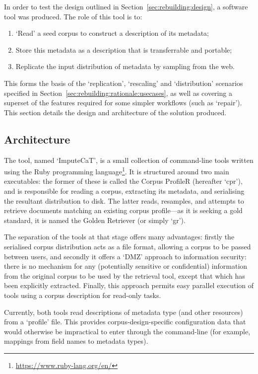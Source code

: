 In order to test the design outlined in Section~\ref{sec:rebuilding:design}, a software tool was produced.  The role of this tool is to:

\begin{enumerate}
    \item `Read' a seed corpus to construct a description of its metadata;
    \item Store this metadata as a description that is transferrable and portable;
    \item Replicate the input distribution of metadata by sampling from the web.
\end{enumerate}

This forms the basis of the `replication', `rescaling' and `distribution' scenarios specified in Section~\ref{sec:rebuilding:rationale:usecases}, as well as covering a superset of the features required for some simpler workflows (such as `repair').  This section details the design and architecture of the solution produced.


\subsection{Architecture}
The tool, named `ImputeCaT', is a small collection of command-line tools written using the Ruby programming language\footnote{\url{https://www.ruby-lang.org/en/}}. It is structured around two main executables: the former of these is called the Corpus ProfileR (hereafter `cpr'), and is responsible for reading a corpus, extracting its metadata, and serialising the resultant distribution to disk.  The latter reads, resamples, and attempts to retrieve documents matching an existing corpus profile---as it is seeking a gold standard, it is named the Golden Retriever (or simply `gr').

The separation of the tools at that stage offers many advantages: firstly the serialised corpus distribution acts as a file format, allowing a corpus to be passed between users, and secondly it offers a `DMZ' approach to information security: there is no mechanism for any (potentially sensitive or confidential) information from the original corpus to be used by the retrieval tool, except that which has been explicitly extracted.  Finally, this approach permits easy parallel execution of tools using a corpus description for read-only tasks.


Currently, both tools read descriptions of metadata type (and other resources) from a `profile' file.  This provides corpus-design-specific configuration data that would otherwise be impractical to enter through the command-line (for example, mappings from field names to metadata types).





